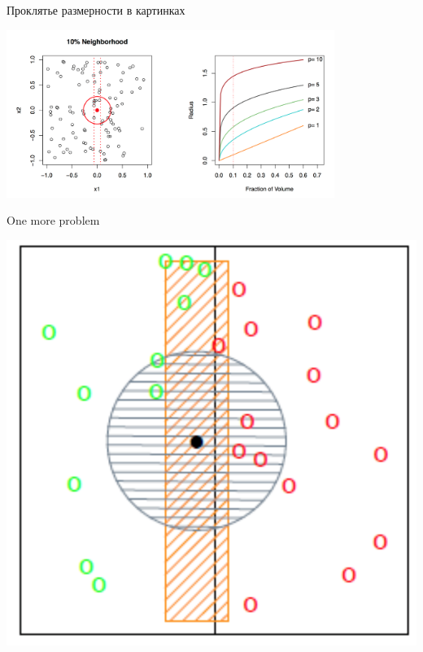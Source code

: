 \documentclass[14pt, fleqn, xcolor={dvipsnames, table}]{beamer}
\begin{document}
\begin{frame}{Проклятье размерности в картинках}
\begin{center}
\includegraphics[width=0.8\textwidth]{curse_of_dim.png}
\end{center}
\end{frame}


\begin{frame}{One more problem}
\begin{center}
\includegraphics[height=0.8\textheight]{DANN_reason.png}
\end{center}
\end{frame}
\end{document}
